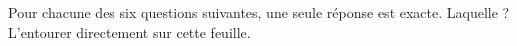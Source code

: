 \documentclass[11pt,a4paper]{article}  %
\begin{document}
	\graphicspath{{images/}}
	
	\begin{center}
		
		
		\fbox{
			\begin{minipage}[]{15cm}
				\begin{center}
					\LARGE{\rule{0.5cm}{0pt}\rule[-0.25cm]{0pt}{0.9cm}
						\textcolor{red}{Correction $-$ Préparation au bac blanc}
					}
				\end{center}
			\end{minipage}
		}
	\end{center}




Pour chacune des six questions suivantes, une seule réponse est exacte. Laquelle ? L'entourer directement sur cette feuille.
\end{document}
